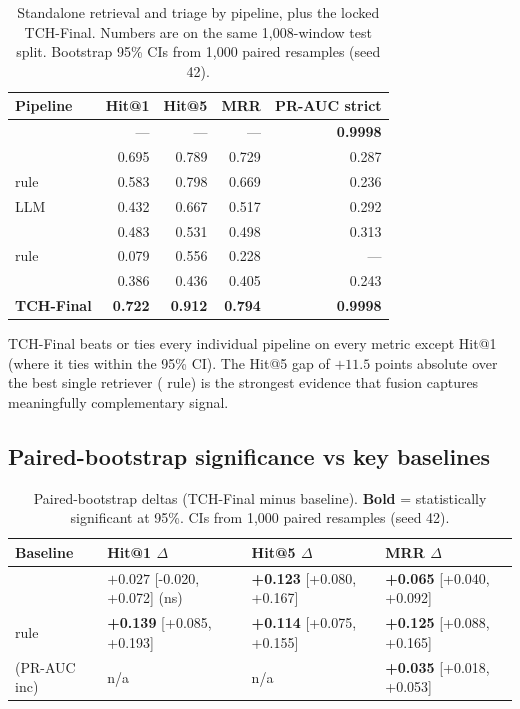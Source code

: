 \begin{table}[h]
\centering
\caption{Standalone retrieval and triage by pipeline, plus the locked TCH-Final. Numbers are on the same 1{,}008-window test split. Bootstrap 95\% CIs from 1{,}000 paired resamples (seed 42).}
\label{tab:vs-baselines}
\small
\begin{tabular}{lrrrr}
\toprule
Pipeline & Hit@1 & Hit@5 & MRR & PR-AUC strict \\
\midrule
\hgb{} & --- & --- & --- & \textbf{0.9998} \\
\bienc{} & 0.695 & 0.789 & 0.729 & 0.287 \\
\hrrf{} rule & 0.583 & 0.798 & 0.669 & 0.236 \\
\hrrf{} LLM  & 0.432 & 0.667 & 0.517 & 0.292 \\
\logseq{} & 0.483 & 0.531 & 0.498 & 0.313 \\
\kgret{} rule & 0.079 & 0.556 & 0.228 & --- \\
\agent{} & 0.386 & 0.436 & 0.405 & 0.243 \\
\midrule
\textbf{TCH-Final}     & \textbf{0.722} & \textbf{0.912} & \textbf{0.794} & \textbf{0.9998} \\
\bottomrule
\end{tabular}
\end{table}

TCH-Final beats or ties every individual pipeline on every metric except Hit@1 (where it ties \bienc{} within the 95\% CI). The Hit@5 gap of $+11.5$ points absolute over the best single retriever (\hrrf{} rule) is the strongest evidence that fusion captures meaningfully complementary signal.

\subsection{Paired-bootstrap significance vs key baselines}

\begin{table}[h]
\centering
\caption{Paired-bootstrap deltas (TCH-Final minus baseline). \textbf{Bold} = statistically significant at 95\%. CIs from 1{,}000 paired resamples (seed 42).}
\label{tab:paired-deltas}
\small
\begin{tabular}{llll}
\toprule
Baseline & Hit@1 $\Delta$ & Hit@5 $\Delta$ & MRR $\Delta$ \\
\midrule
\bienc{} & $+0.027$ [-0.020, +0.072] (ns) & \textbf{+0.123} [+0.080, +0.167] & \textbf{+0.065} [+0.040, +0.092] \\
\hrrf{} rule & \textbf{+0.139} [+0.085, +0.193] & \textbf{+0.114} [+0.075, +0.155] & \textbf{+0.125} [+0.088, +0.165] \\
\hgb{} (PR-AUC inc) & n/a & n/a & \textbf{+0.035} [+0.018, +0.053] \\
\bottomrule
\end{tabular}
\end{table}


